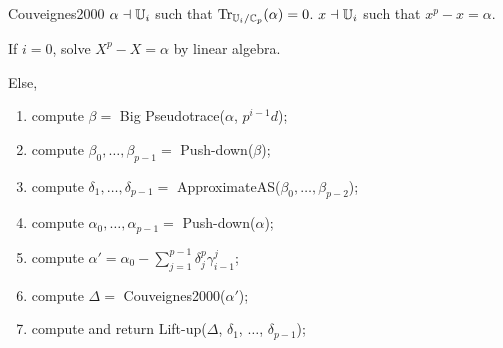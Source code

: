 \begin{algorithm}
  {Couveignes2000}
  {$\alpha\dashv\mathbb{U}_i$ such that $\operatorname{Tr}_{\mathbb{U}_i/\mathbb{C}_p}(\alpha)=0$.}
  {$x\dashv\mathbb{U}_i$ such that $x^p-x=\alpha$.}
\item \label{alg:cou:base}If $i=0$, solve $X^p-X=\alpha$ by linear
  algebra.
\item Else,
  \begin{enumerate}
  \item \label{alg:cou:pseudo}compute $\beta = $ Big
    Pseudotrace($\alpha$, $p^{i-1}d$);
  \item \label{alg:cou:push-beta}compute $\beta_0,\ldots,\beta_{p-1}=$
    Push-down($\beta$);
  \item \label{alg:cou:approx}compute $\delta_1,\ldots,\delta_{p-1}=$
    ApproximateAS($\beta_0,\ldots,\beta_{p-2}$);
  \item \label{alg:cou:push-alpha} compute $\alpha_0, \ldots,
    \alpha_{p-1} =$ Push-down($\alpha$);
  \item \label{alg:cou:approximant}compute $\alpha' = \alpha_0 -
    \sum_{j=1}^{p-1} \delta_j^p\gamma_{i-1}^j$;
  \item \label{alg:cou:rec}compute $\Delta =$ Couveignes2000($\alpha'$);
  \item \label{alg:cou:lift}compute and return Lift-up($\Delta$,
    $\delta_1$, $\ldots$, $\delta_{p-1}$);
  \end{enumerate}
\end{algorithm}

